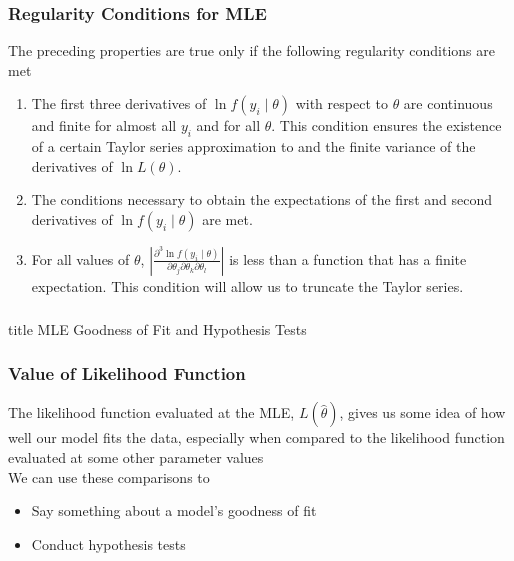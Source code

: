 \documentclass{beamer}
\begin{document}
\begin{frame}\frametitle{Regularity Conditions for MLE}
    The preceding properties are true only if the following regularity conditions are met
    \begin{enumerate}
        \item The first three derivatives of $\ln f(y_i \mid \theta)$ with respect to $\theta$ are continuous and finite for almost all $y_i$ and for all $\theta$. This condition ensures the existence of a certain Taylor series approximation to and the finite variance of the derivatives of $\ln L(\theta)$.
        \item The conditions necessary to obtain the expectations of the first and second derivatives of $\ln f(y_i \mid \theta)$ are met.
        \item For all values of $\theta$, $\left\vert \frac{\partial^3 \ln f(y_i \mid \theta)}{\partial \theta_j \partial \theta_k \partial \theta_l} \right\vert$ is less than a function that has a
        finite expectation. This condition will allow us to truncate the Taylor series.
    \end{enumerate}
\end{frame}

\begin{frame}\frametitle{}
    \vfill
    \centering
    \begin{beamercolorbox}[center]{title}
        \Large MLE Goodness of Fit and Hypothesis Tests
    \end{beamercolorbox}
    \vfill
\end{frame}

\begin{frame}\frametitle{Value of Likelihood Function}
    The likelihood function evaluated at the MLE, $L(\hat{\theta})$, gives us some idea of how well our model fits the data, especially when compared to the likelihood function evaluated at some other parameter values \\
    \vspace{3ex}
    We can use these comparisons to 
    \begin{itemize}
        \item Say something about a model's goodness of fit
        \item Conduct hypothesis tests
    \end{itemize}
\end{frame}
\end{document}
